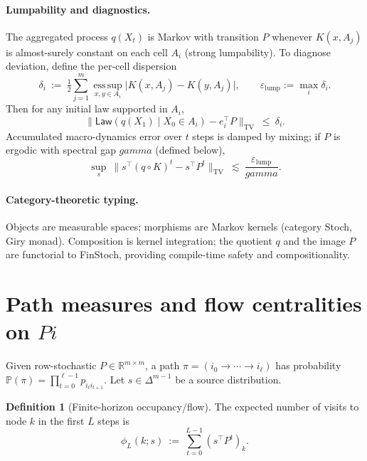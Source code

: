 \documentclass[11pt]{article}
\def\Pi{Pi}%
\def\sgap{gamma}%
\newcommand{\PP}{\mathbb P}
\newcommand{\RR}{\mathbb R}
\newcommand{\1}{\mathbbm{1}}
\newcommand{\TV}{\mathrm{TV}}
\newcommand{\Law}{\mathsf{Law}}
\newcommand{\sgap}{\gamma}
\theoremstyle{plain}
\theoremstyle{definition}
\newtheorem{definition}[theorem]{Definition}
\begin{document}
\paragraph{Lumpability and diagnostics.}
The aggregated process $q(X_t)$ is Markov with transition $P$ whenever $K(x,A_j)$ is almost-surely constant on each cell $A_i$ (strong lumpability). To diagnose deviation, define the per-cell dispersion
\begin{equation}
\label{eq:lump-dispersion}
\delta_i\ :=\ \tfrac12\sum_{j=1}^m \operatorname*{ess\,sup}_{x,y\in A_i}\big|K(x,A_j)-K(y,A_j)\big|,\qquad
\varepsilon_{\mathrm{lump}}:=\max_i \delta_i.
\end{equation}
Then for any initial law supported in $A_i$,
\begin{equation}
\label{eq:one-step-tv}
\big\| \Law(q(X_1)\mid X_0\in A_i) - e_i^\top P\big\|_{\TV}\ \le\ \delta_i.
\end{equation}
Accumulated macro-dynamics error over $t$ steps is damped by mixing; if $P$ is ergodic with spectral gap $\sgap$ (defined below),
\begin{equation}
\label{eq:tstep-tv}
\sup_{s}\ \big\| s^\top (q\!\circ\!K)^t - s^\top P^t \big\|_{\TV}\ \lesssim\ \frac{\varepsilon_{\mathrm{lump}}}{\sgap}.
\end{equation}

\paragraph{Category-theoretic typing.}
Objects are measurable spaces; morphisms are Markov kernels (category \textsf{Stoch}, Giry monad). Composition is kernel integration; the quotient $q$ and the image $P$ are functorial to \textsf{FinStoch}, providing compile-time safety and compositionality.

\section{Path measures and flow centralities on \texorpdfstring{$\Pi$}{Pi}}
\label{sec:flow-central}
Given row-stochastic $P\in\RR^{m\times m}$, a path $\pi=(i_0\to\cdots\to i_\ell)$ has probability $\PP(\pi)=\prod_{t=0}^{\ell-1}p_{i_t i_{t+1}}$. Let $s\in\Delta^{m-1}$ be a source distribution.

\begin{definition}[Finite-horizon occupancy/flow]
\label{def:phiL}
The expected number of visits to node $k$ in the first $L$ steps is
\begin{equation}
\phi_L(k;s)\ :=\ \sum_{t=0}^{L-1} (s^\top P^t)_k.
\end{equation}
\end{definition}
\end{document}
